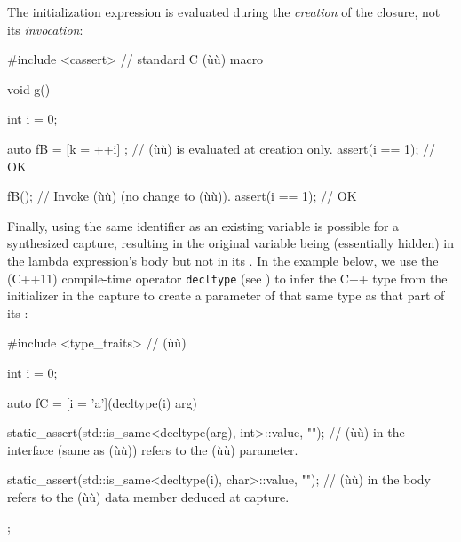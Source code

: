 \noindent The initialization expression is evaluated during the \emph{creation} of
the closure, not its \emph{invocation}:

\begin{emcppslisting}[emcppsstandards={c++14}]
#include <cassert>  // standard C (ù{}ù) macro

void g()
{
    int i = 0;

    auto fB = [k = ++i]{ };  // (ù{}ù) is evaluated at creation only.
    assert(i == 1);  // OK

    fB();  // Invoke (ù{}ù) (no change to (ù{}ù)).
    assert(i == 1);  // OK
}
\end{emcppslisting}

\noindent Finally, using the same identifier as an existing
variable is possible for a synthesized capture, resulting in the original variable
being  (essentially hidden) in the lambda expression's
body but not in its . In the example below,
we use the (C++11) compile-time operator
\lstinline!decltype! (see ) to infer the C++ type from the
initializer in the capture to create a parameter of that same type as
that part of its :

\begin{emcppslisting}[emcppserrorlines={10},emcppsstandards={c++14}]
#include <type_traits>  // (ù{}ù)

int i = 0;

auto fC = [i = 'a'](decltype(i) arg)
{
    static_assert(std::is_same<decltype(arg), int>::value, "");
         // (ù{}ù) in the interface (same as (ù{}ù)) refers to the (ù{}ù) parameter.

    static_assert(std::is_same<decltype(i), char>::value, "");
        // (ù{}ù) in the body refers to the (ù{}ù) data member deduced at capture.
};
\end{emcppslisting}

